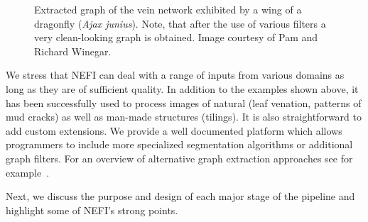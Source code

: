 	\begin{figure}
	\centering
	\caption[\emph{Ajax junius} - Extracted graph]{Extracted graph of the vein network exhibited by a wing of a dragonfly (\emph{Ajax junius}). Note, that after the use of various filters a very clean-looking graph is obtained. Image courtesy of Pam and Richard Winegar.}
	\label{fig:dragonlfy}
	\end{figure}


	We stress that NEFI can deal with a range of inputs from various domains as long as they are of sufficient quality. In addition to the examples shown above, it has been successfully used to process images of natural (\eg leaf venation, patterns of mud cracks) as well as man-made structures (tilings). It is also straightforward to add custom extensions. We provide a well documented platform which allows programmers to include more specialized segmentation algorithms or additional graph filters. For an overview of alternative graph extraction approaches see for example~\cite{dehkordi2011review}.

	Next, we discuss the purpose and design of each major stage of the pipeline and highlight some of NEFI's strong points.








